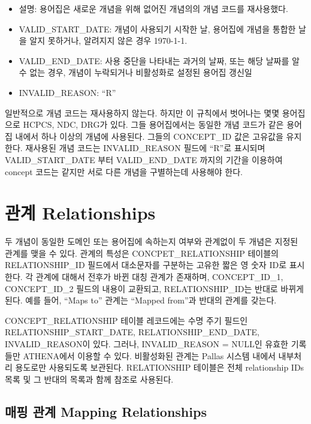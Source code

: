 \documentclass[11pt]{book}
\providecommand{\tightlist}{%
  \setlength{\itemsep}{0pt}\setlength{\parskip}{0pt}}
\theoremstyle{definition}
\theoremstyle{definition}
\theoremstyle{definition}
\theoremstyle{remark}
\begin{document}
\begin{itemize}
  \begin{itemize}
  \tightlist
  \item
    설명: 용어집은 새로운 개념을 위해 없어진 개념의의 개념 코드를
    재사용했다.
  \item
    VALID\_START\_DATE: 개념이 사용되기 시작한 날, 용어집에 개념을
    통합한 날을 알지 못하거나, 알려지지 않은 경우 1970-1-1.\\
  \item
    VALID\_END\_DATE: 사용 중단을 나타내는 과거의 날짜, 또는 해당 날짜를
    알 수 없는 경우, 개념이 누락되거나 비활성화로 설정된 용어집 갱신일
  \item
    INVALID\_REASON: ``R''
  \end{itemize}
\end{itemize}

일반적으로 개념 코드는 재사용하지 않는다. 하지만 이 규칙에서 벗어나는
몇몇 용어집으로 HCPCS, NDC, DRG가 있다. 그들 용어집에서는 동일한 개념
코드가 같은 용어집 내에서 하나 이상의 개념에 사용된다. 그들의
CONCEPT\_ID 값은 고유값을 유지한다. 재사용된 개념 코드는 INVALID\_REASON
필드에 ``R''로 표시되며 VALID\_START\_DATE 부터 VALID\_END\_DATE 까지의
기간을 이용하여 concept 코드는 같지만 서로 다른 개념을 구별하는데
사용해야 한다.

\section{관계 Relationships}\label{-relationships}

두 개념이 동일한 도메인 또는 용어집에 속하는지 여부와 관계없이 두 개념은
지정된 관계를 맺을 수 있다. 관계의 특성은 CONCPET\_RELATIONSHIP 테이블의
RELATIONSHIP\_ID 필드에서 대소문자를 구분하는 고유한 짧은 영 숫자 ID로
표시한다. 각 관계에 대해서 전후가 바뀐 대칭 관계가 존재하며,
CONCEPT\_ID\_1, CONCEPT\_ID\_2 필드의 내용이 교환되고,
RELATIONSHIP\_ID는 반대로 바뀌게 된다. 예를 들어, ``Maps to'' 관계는
``Mapped from''과 반대의 관계를 갖는다. 

CONCEPT\_RELATIONSHIP 테이블 레코드에는 수명 주기 필드인
RELATIONSHIP\_START\_DATE, RELATIONSHIP\_END\_DATE, INVALID\_REASON이
있다. 그러나, INVALID\_REASON = NULL인 유효한 기록들만 ATHENA에서 이용할
수 있다. 비활성화된 관계는 Pallas 시스템 내에서 내부처리 용도로만
사용되도록 보관된다. RELATIONSHIP 테이블은 전체 relationship IDs 목록 및
그 반대의 목록과 함께 참조로 사용된다.

\subsection{매핑 관계 Mapping Relationships}\label{conceptMapping}
\end{document}
